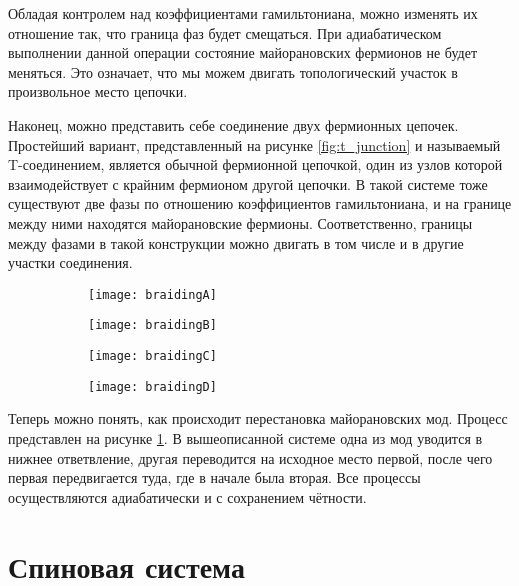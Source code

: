 \documentclass[a4paper,12pt]{article}
\theoremstyle{plain} %
\theoremstyle{definition} %
\theoremstyle{remark} %
\begin{document}
Обладая контролем над коэффициентами гамильтониана, можно изменять их отношение так, что граница фаз будет смещаться. При адиабатическом выполнении данной операции состояние майорановских фермионов не будет меняться. Это означает, что мы можем двигать топологический участок в произвольное место цепочки.

Наконец, можно представить себе соединение двух фермионных цепочек. Простейший вариант, представленный на рисунке \ref{fig:t_junction} и называемый T-соединением, является обычной фермионной цепочкой, один из узлов которой взаимодействует с крайним фермионом другой цепочки. В такой системе тоже существуют две фазы по отношению коэффициентов гамильтониана, и на границе между ними находятся майорановские фермионы. Соответственно, границы между фазами в такой конструкции можно двигать в том числе и в другие участки соединения.

\begin{figure}
    \centering
    \begin{subfigure}{0.25\textwidth}
        \centering
        \texttt{[image: braidingA]}
    \end{subfigure}%
    \begin{subfigure}{0.25\textwidth}
        \centering
        \vspace{10pt}
        \texttt{[image: braidingB]}
    \end{subfigure}%
    \begin{subfigure}{0.25\textwidth}
        \centering
        \texttt{[image: braidingC]}
    \end{subfigure}%
    \begin{subfigure}{0.25\textwidth}
        \centering
        \texttt{[image: braidingD]}
    \end{subfigure}%
    \label{fig:braiding}
\end{figure}

Теперь можно понять, как происходит перестановка майорановских мод. Процесс представлен на рисунке \ref{fig:braiding}. В вышеописанной системе одна из мод уводится в нижнее ответвление, другая переводится на исходное место первой, после чего первая передвигается туда, где в начале была вторая. Все процессы осуществляются адиабатически и с сохранением чётности.


\pagebreak

\section{Спиновая система}

\pagebreak



\end{document}
